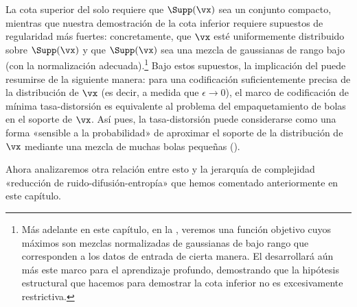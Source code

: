 \documentclass[../../book-main.tex]{subfiles}
\begin{document}
La cota superior del  solo requiere que
$\Supp(\vx)$ sea un conjunto compacto, mientras que nuestra demostración de la cota inferior requiere
supuestos de regularidad más fuertes: concretamente, que $\vx$ esté uniformemente
distribuido sobre $\Supp(\vx)$ y que $\Supp(\vx)$ sea una mezcla de
gaussianas de rango bajo (con la normalización adecuada).\footnote{Más adelante en este capítulo, 
en la , veremos una función objetivo cuyos máximos son mezclas normalizadas 
de gaussianas de bajo rango que corresponden a los datos de entrada de cierta manera.
El  desarrollará aún más este marco para el aprendizaje profundo,
demostrando que la hipótesis estructural que hacemos para demostrar la cota inferior
no es excesivamente restrictiva.}
Bajo estos supuestos, la implicación del
 puede resumirse de la siguiente manera: para
una codificación suficientemente precisa de la distribución de
$\vx$ (es decir, a medida que $\epsilon \to 0$), el marco de codificación de mínima tasa-distorsión
es equivalente al
problema del empaquetamiento de bolas en el soporte de $\vx$.
Así pues, la tasa-distorsión puede considerarse como una forma «sensible a la probabilidad» de
aproximar el soporte de la distribución de 
\(\vx\) mediante una mezcla de muchas bolas pequeñas ().

Ahora analizaremos otra relación entre esto y la
jerarquía de complejidad «reducción de ruido-difusión-entropía» que hemos comentado anteriormente en este
capítulo.
\end{document}
